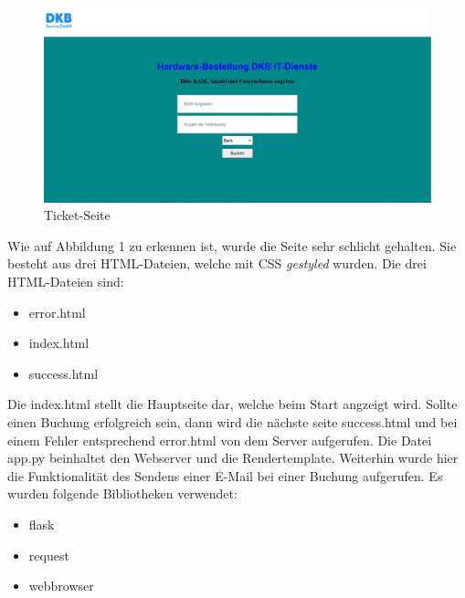\begin{figure}[H] 
  \centering
     \includegraphics[width=1\textwidth]{ticketseite.jpg}
  \caption{Ticket-Seite}
  \label{fig:Bild1}
\end{figure}

\noindent
Wie auf Abbildung 1 zu erkennen ist, wurde die Seite sehr schlicht gehalten. Sie besteht aus drei HTML-Dateien, welche mit CSS \textit{gestyled} wurden. Die drei HTML-Dateien sind:

\begin{itemize}
	\item error.html
	\item index.html
	\item success.html
\end{itemize}

\noindent
Die index.html stellt die Hauptseite dar, welche beim Start angzeigt wird. Sollte einen Buchung erfolgreich sein, dann wird die nächste seite success.html und bei einem Fehler entsprechend error.html von dem Server aufgerufen. Die Datei app.py beinhaltet den Webserver und die Rendertemplate. Weiterhin wurde hier die Funktionalität des Sendens einer E-Mail bei einer Buchung aufgerufen. Es wurden folgende Bibliotheken verwendet:
\begin{itemize}
	\item flask
	\item request
	\item webbrowser
\end{itemize}

